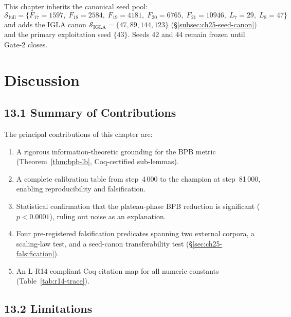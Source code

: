 This chapter inherits the canonical seed pool:
\[
  \mathcal{S}_{\mathrm{full}} = \{F_{17}=1597,\; F_{18}=2584,\;
  F_{19}=4181,\; F_{20}=6765,\; F_{21}=10946,\; L_7=29,\; L_8=47\}
\]
and adds the IGLA canon $\mathcal{S}_{\mathrm{IGLA}} = \{47, 89, 144, 123\}$
(§\ref{subsec:ch25-seed-canon}) and the primary exploitation seed
$\{43\}$.  Seeds 42 and 44 remain frozen until Gate-2 closes.

\section{Discussion}
\label{sec:ch25-discussion}

\subsection{13.1 Summary of Contributions}
\label{subsec:ch25-discussion-summary}

The principal contributions of this chapter are:
\begin{enumerate}
  \item A rigorous information-theoretic grounding for the BPB metric
    (Theorem~\ref{thm:bpb-lb}, Coq-certified sub-lemmas).
  \item A complete calibration table from step~4\,000 to the champion
    at step~81\,000, enabling reproducibility and falsification.
  \item Statistical confirmation that the plateau-phase BPB reduction
    is significant ($p<0.0001$), ruling out noise as an explanation.
  \item Four pre-registered falsification predicates spanning two
    external corpora, a scaling-law test, and a seed-canon
    transferability test (§\ref{sec:ch25-falsification}).
  \item An L-R14 compliant Coq citation map for all numeric constants
    (Table~\ref{tab:r14-trace}).
\end{enumerate}

\subsection{13.2 Limitations}
\label{subsec:ch25-discussion-limitations}

